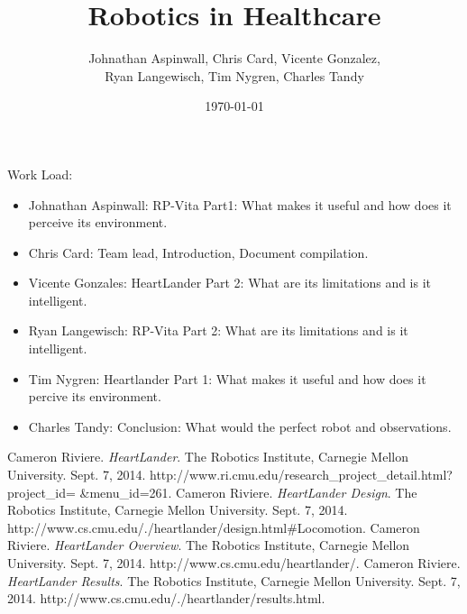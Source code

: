 \documentclass[12pt,conference]{IEEEtran}
\title{Robotics in Healthcare}
\date{\today}
\author{Johnathan Aspinwall, Chris Card, Vicente Gonzalez, \\
Ryan Langewisch, Tim Nygren, Charles Tandy}
\begin{document}
\maketitle
\thispagestyle{plain}
\pagestyle{plain}






\appendix
Work Load:
\begin{itemize}
\item Johnathan Aspinwall: RP-Vita Part1: What makes it useful and how does it perceive its environment.
\item Chris Card: Team lead, Introduction, Document compilation.
\item Vicente Gonzales: HeartLander Part 2: What are its limitations and is it intelligent.
\item Ryan Langewisch: RP-Vita Part 2: What are its limitations and is it intelligent. 
\item Tim Nygren: Heartlander Part 1: What makes it useful and how does it percive its environment.
\item Charles Tandy: Conclusion: What would the perfect robot and observations.
\end{itemize}

\begin{thebibliography}{4}
  Cameron Riviere. {\em HeartLander}. The Robotics Institute, Carnegie Mellon University. Sept. 7, 2014. http://www.ri.cmu.edu/research\_project\_detail.html?project\_id=
\&menu\_id=261.
  Cameron Riviere. {\em HeartLander Design}. The Robotics Institute, Carnegie Mellon University. Sept. 7, 2014. http://www.cs.cmu.edu/\texttildelow{}./heartlander/design.html\#Locomotion.
  Cameron Riviere. {\em HeartLander Overview}. The Robotics Institute, Carnegie Mellon University. Sept. 7, 2014. http://www.cs.cmu.edu/\texttildelow{}heartlander/.
  Cameron Riviere. {\em HeartLander Results}. The Robotics Institute, Carnegie Mellon University. Sept. 7, 2014. http://www.cs.cmu.edu/\texttildelow{}./heartlander/results.html.
\end{thebibliography}
\end{document}
